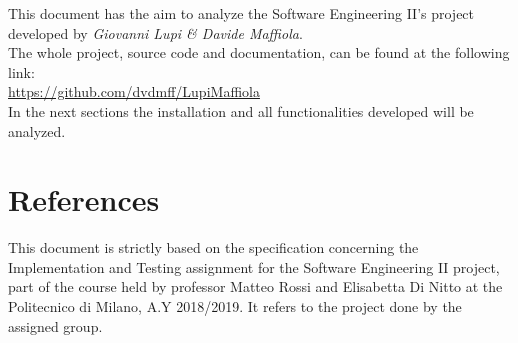 This document has the aim to analyze the Software Engineering II's project developed by \textit{Giovanni Lupi \& Davide Maffiola}.\\
The whole project, source code and documentation, can be found at the following link:\\
\url{https://github.com/dvdmff/LupiMaffiola}\\

In the next sections the installation and all functionalities developed will be analyzed.

\section{References}
This document is strictly based on the specification concerning the Implementation and Testing assignment for the Software Engineering II project, part of the course held by professor Matteo Rossi and Elisabetta Di Nitto at the Politecnico di Milano, A.Y 2018/2019. It refers to the project done by the assigned group.